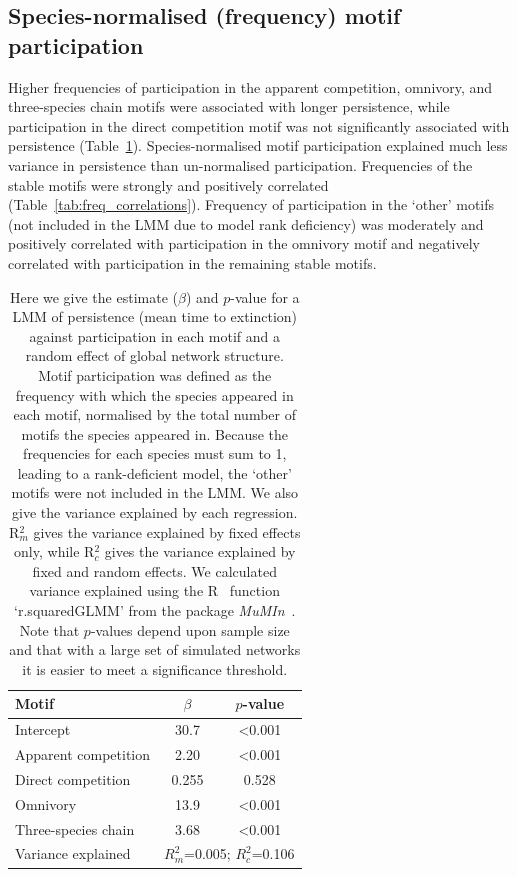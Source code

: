 \documentclass[12pt]{article}
\begin{document}
	\subsection*{Species-normalised (frequency) motif participation}

		Higher frequencies of participation in the apparent competition, omnivory, and three-species chain motifs were associated with longer persistence, while participation in the direct competition motif was not significantly associated with persistence (Table~\ref{tab:persistence_freq}).
		Species-normalised motif participation explained much less variance in persistence than un-normalised participation.
		Frequencies of the stable motifs were strongly and positively correlated (Table~\ref{tab:freq_correlations}).
		Frequency of participation in the `other' motifs (not included in the LMM due to model rank deficiency) was moderately and positively correlated with participation in the omnivory motif and negatively correlated with participation in the remaining stable motifs.


		\begin{table}[hb!]
    		\caption{Here we give the estimate ($\beta$) and $p$-value for a LMM of persistence (mean time to extinction) against participation in each motif and a random effect of global network structure. Motif participation was defined as the frequency with which the species appeared in each motif, normalised by the total number of motifs the species appeared in. Because the frequencies for each species must sum to 1, leading to a rank-deficient model, the `other' motifs were not included in the LMM. We also give the variance explained by each regression. R$^{2}_{m}$ gives the variance explained by fixed effects only, while R$^{2}_{c}$ gives the variance explained by fixed and random effects. We calculated variance explained using the R~\citep{R} function `r.squaredGLMM' from the package \emph{MuMIn}~\citep{MuMIn}. Note that $p$-values depend upon sample size and that with a large set of simulated networks it is easier to meet a significance threshold.}
    		\label{tab:persistence_freq}
    		\begin{tabular}{l | c c}
    		 Motif & $\beta$ & $p$-value \\  
    		 \hline
    		 Intercept & 30.7 & \textless0.001 \\
    		 \hline
    		 Apparent competition & 2.20 & \textless0.001 \\
    		 Direct competition & 0.255 & 0.528 \\
    		 Omnivory & 13.9 & \textless0.001 \\
    		 Three-species chain & 3.68 & \textless0.001 \\
    		 \hline
    		 Variance explained & \multicolumn{2}{c}{$R^{2}_m$=0.005; $R^{2}_c$=0.106} \\
    		 \hline
    		 \end{tabular}
    		 \end{table}
\end{document}
